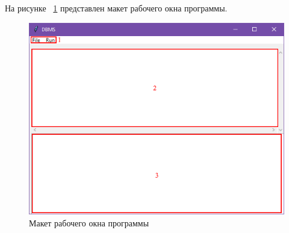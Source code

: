 На рисунке ~\ref{fig:interface} представлен макет рабочего окна программы. 

\begin{figure}[H]
	\centering
	\includegraphics[width=1\linewidth]{images/interface}
	\caption{Макет рабочего окна программы}
	\label{fig:interface}
\end{figure}

